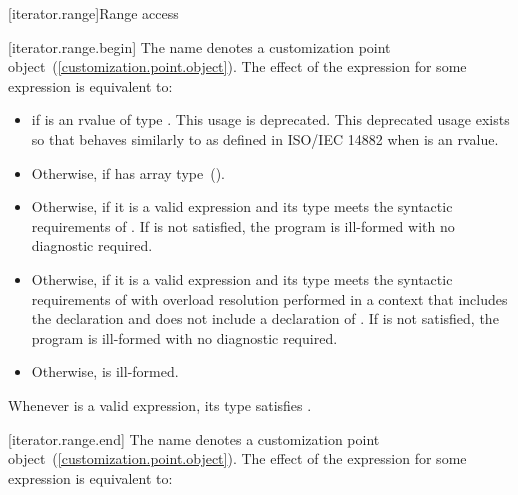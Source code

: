 [iterator.range]{Range access}

[iterator.range.begin]{}
\pnum
The name  denotes a customization point
 object~(\ref{customization.point.object}). The effect of the expression
 for some expression  is equivalent to:

\begin{itemize}
\item
   if  is an rvalue of
  type . This usage is deprecated.
  \enternote This deprecated usage exists so that
   behaves similarly to 
  as defined in ISO/IEC 14882 when  is an rvalue. \exitnote

\item
  Otherwise,  if  has array
  type~().

\item
  Otherwise,  if it is a valid expression and its type  meets the
  syntactic requirements of . If
   is not satisfied, the program is ill-formed
  with no diagnostic required.

\item
  Otherwise,  if it is a valid expression and its type  meets the
  syntactic requirements of  with overload
  resolution performed in a context that includes the declaration
   and does not include
  a declaration of . If 
  is not satisfied, the program is ill-formed with no diagnostic
  required.

\item
  Otherwise,  is ill-formed.
\end{itemize}

\pnum
\enternote Whenever  is a valid expression, its
type satisfies . \exitnote

[iterator.range.end]{}
\pnum
The name  denotes a customization point
object~(\ref{customization.point.object}). The effect of the expression
 for some expression  is equivalent to:

